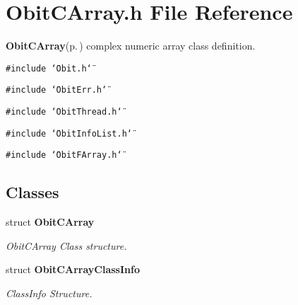 \section{Obit\-CArray.h File Reference}
\label{ObitCArray_8h}
{\bf Obit\-CArray}{\rm (p.\,\pageref{structObitCArray})} complex numeric array class definition. 

{\tt \#include \char`\"{}Obit.h\char`\"{}}\par
{\tt \#include \char`\"{}Obit\-Err.h\char`\"{}}\par
{\tt \#include \char`\"{}Obit\-Thread.h\char`\"{}}\par
{\tt \#include \char`\"{}Obit\-Info\-List.h\char`\"{}}\par
{\tt \#include \char`\"{}Obit\-FArray.h\char`\"{}}\par
\subsection*{Classes}
\begin{CompactItemize}
\item 
struct {\bf Obit\-CArray}
\begin{CompactList}\small\item\em Obit\-CArray Class structure. \item\end{CompactList}\item 
struct {\bf Obit\-CArray\-Class\-Info}
\begin{CompactList}\small\item\em Class\-Info Structure. \item\end{CompactList}\end{CompactItemize}
